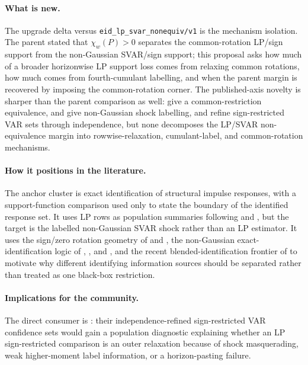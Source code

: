 \documentclass[11pt]{article}
\theoremstyle{definition}
\theoremstyle{plain}
\theoremstyle{remark}
\begin{document}
\paragraph{What is new.}
The upgrade delta versus \texttt{eid\_lp\_svar\_nonequiv/v1} is the mechanism isolation.  The parent stated that \(\chi_w(P)>0\) separates the common-rotation LP/sign support from the non-Gaussian SVAR/sign support; this proposal asks how much of a broader horizonwise LP support loss comes from relaxing common rotations, how much comes from fourth-cumulant labelling, and when the parent margin is recovered by imposing the common-rotation corner.  The published-axis novelty is sharper than the parent comparison as well: \citet{PlagborgMollerWolf2021} give a common-restriction equivalence, \citet{GourierouxMonfortRenne2017} and \citet{LanneMeitzSaikkonen2017} give non-Gaussian shock labelling, and \citet{DrautzburgWright2023} refine sign-restricted VAR sets through independence, but none decomposes the LP/SVAR non-equivalence margin into rowwise-relaxation, cumulant-label, and common-rotation mechanisms.

\paragraph{How it positions in the literature.}
The anchor cluster is exact identification of structural impulse responses, with a support-function comparison used only to state the boundary of the identified response set.  It uses LP rows as population summaries following \citet{Jorda2005} and \citet{PlagborgMollerWolf2021}, but the target is the labelled non-Gaussian SVAR shock rather than an LP estimator.  It uses the sign/zero rotation geometry of \citet{AriasRubioRamirezWaggoner2018} and \citet{Read2022}, the non-Gaussian exact-identification logic of \citet{GourierouxMonfortRenne2017}, \citet{LanneMeitzSaikkonen2017}, and \citet{Guay2021}, and the recent blended-identification frontier of \citet{CarrieroMarcellinoTornese2024} to motivate why different identifying information sources should be separated rather than treated as one black-box restriction.

\paragraph{Implications for the community.}
The direct consumer is \citet{DrautzburgWright2023}: their independence-refined sign-restricted VAR confidence sets would gain a population diagnostic explaining whether an LP sign-restricted comparison is an outer relaxation because of shock masquerading, weak higher-moment label information, or a horizon-pasting failure.
\end{document}
